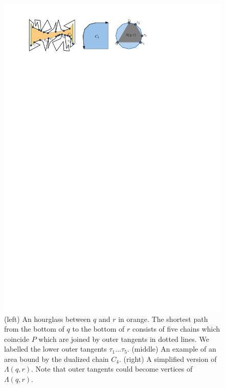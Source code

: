 \documentclass[a4paper, UKenglish]{paper}
\begin{document}
\begin{figure}[h]
    \centering
    \includegraphics[]{../chain}
    \caption{(left) An hourglass between $q$ and $r$ in orange. The shortest path from the bottom of $q$ to the bottom of $r$ consists of five chains which coincide $P$ which are joined by outer tangents in dotted lines. We labelled the lower outer tangents $\tau_1 \ldots \tau_5$. (middle) An example of an area bound by the dualized chain $C_4$. (right) A simplified version of $\Lambda(q,r)$. Note that outer tangents could become vertices of $\Lambda(q,r)$.}
    \label{fig:chain}
\end{figure}
\end{document}

